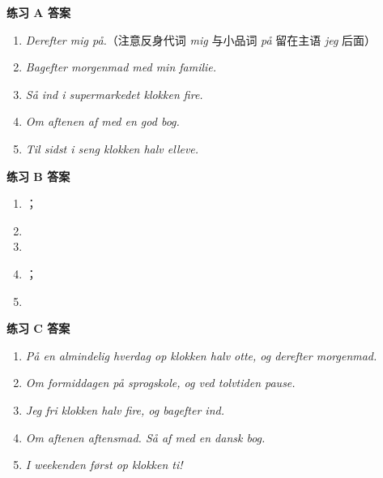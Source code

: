 \begin{answerbox}
\textbf{练习 A 答案}
\begin{enumerate}
  \item \textit{Derefter  mig på.}（注意反身代词 \textit{mig} 与小品词 \textit{på} 留在主语 \textit{jeg} 后面）
  \item \textit{Bagefter  morgenmad med min familie.}
  \item \textit{Så  ind i supermarkedet klokken fire.}
  \item \textit{Om aftenen  af med en god bog.}
  \item \textit{Til sidst  i seng klokken halv elleve.}
\end{enumerate}

\textbf{练习 B 答案}
\begin{enumerate}
  \item {}；
  \item {}
  \item {}
  \item {}；
  \item {}
\end{enumerate}

\textbf{练习 C 答案}
\begin{enumerate}
  \item \textit{På en almindelig hverdag  op klokken halv otte, og derefter  morgenmad.}
  \item \textit{Om formiddagen  på sprogskole, og ved tolvtiden  pause.}
  \item \textit{Jeg  fri klokken halv fire, og bagefter  ind.}
  \item \textit{Om aftenen  aftensmad. Så  af med en dansk bog.}
  \item \textit{I weekenden  først op klokken ti!}
\end{enumerate}


\end{answerbox}

